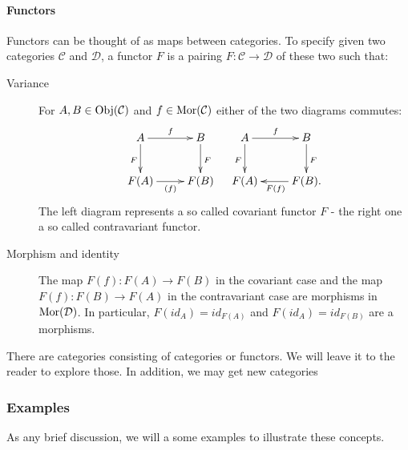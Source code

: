 \paragraph{Functors}
Functors can be thought of as maps between categories. To specify given two categories $\mathcal{C}$ and $\mathcal{D}$, a functor $F$ is a pairing $F : \mathcal{C} \longrightarrow \mathcal{D}$ of these two such that:
\begin{description}
\item[Variance] For $A, B \in \mathrm{Obj}({\mathcal{C}})$ and $f \in \mathrm{Mor}(\mathcal{C})$ either of the two diagrams commutes:
$$\begin{array}{cc}
\xymatrix{
A \ar[d]_F\ar[r]^f& B\ar[d]^F\\
F(A) \ar[r]_{(f)} &F(B)\\
} & \xymatrix{
A \ar[d]_F\ar[r]^f& B\ar[d]^F\\
F(A)  &F(B).\ar[l]^{F(f)}\\
} 
\end{array}
$$
The left diagram represents a so called covariant functor $F$ - the right one a so called contravariant functor.
\item[Morphism and identity] The map $F(f) : F(A) \longrightarrow F(B)$ in the covariant case and the map $F(f) : F(B) \longrightarrow F(A)$ in the contravariant case are morphisms in $\mathrm{Mor}(\mathcal{D})$. In particular, $F(id_A) = id_{F(A)}$ and $F(id_A) = id_{F(B)}$ are a morphisms.
\end{description}
There are categories consisting of categories or functors. We will leave it to the reader to explore those. In addition, we may get new categories 
\subsubsection{Examples}
As any brief discussion, we will a some examples to illustrate these concepts.

